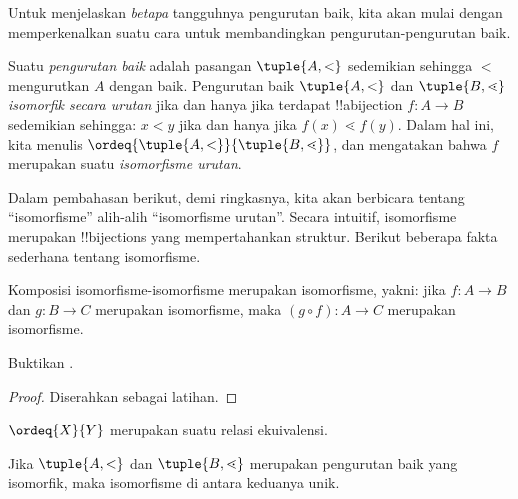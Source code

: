 \documentclass[../../../include/open-logic-section]{subfiles}
\begin{document}

Untuk menjelaskan \emph{betapa} tangguhnya pengurutan baik, kita akan mulai
dengan memperkenalkan suatu cara untuk membandingkan pengurutan-pengurutan
baik.

\begin{defn}
Suatu \emph{pengurutan baik} adalah pasangan $\tuple{A, <}$ sedemikian
sehingga $<$ mengurutkan $A$ dengan baik. Pengurutan baik $\tuple{A, <}$ dan
$\tuple{B, \lessdot}$ \emph{isomorfik secara urutan} jika dan hanya jika
terdapat !!a{bijection} $f \colon A \to B$ sedemikian sehingga: $x < y$ jika
dan hanya jika $f(x) \lessdot f(y)$. Dalam hal ini, kita menulis
$\ordeq{\tuple{A, <}}{\tuple{B, \lessdot}}$, dan mengatakan bahwa $f$
merupakan suatu \emph{isomorfisme urutan}.
\end{defn}
\noindent
Dalam pembahasan berikut, demi ringkasnya, kita akan berbicara tentang
``isomorfisme'' alih-alih ``isomorfisme urutan''. Secara intuitif,
isomorfisme merupakan !!{bijection}s yang mempertahankan struktur. Berikut
beberapa fakta sederhana tentang isomorfisme.

\begin{lem}
Komposisi isomorfisme-isomorfisme merupakan isomorfisme, yakni: jika $f
\colon A \to B$ dan $g \colon B \to C$ merupakan isomorfisme, maka $(g \circ
f) \colon A \to C$ merupakan isomorfisme.
\end{lem}
\begin{prob}
	Buktikan .
\end{prob}
\begin{proof}
Diserahkan sebagai latihan.
\end{proof}
\begin{cor}
	$\ordeq{X}{Y}$ merupakan suatu relasi ekuivalensi.
\end{cor}
\begin{prop}
Jika $\tuple{A, <}$ dan $\tuple{B, \lessdot}$ merupakan pengurutan baik yang
isomorfik, maka isomorfisme di antara keduanya unik.
\end{prop}
\end{document}
